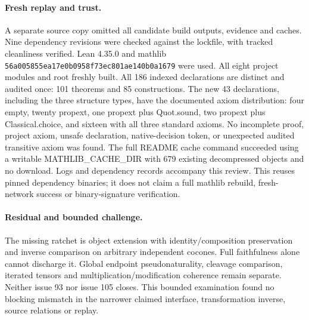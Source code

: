\documentclass{article}
\begin{document}
\paragraph{Fresh replay and trust.} A separate source copy omitted all candidate build outputs, evidence and caches. Nine dependency revisions were checked against the lockfile, with tracked cleanliness verified. Lean 4.35.0 and mathlib \texttt{56a005855ea17e0b0958f73ec801ae140b0a1679} were used. All eight project modules and root freshly built. All 186 indexed declarations are distinct and audited once: 101 theorems and 85 constructions. The new 43 declarations, including the three structure types, have the documented axiom distribution: four empty, twenty propext, one propext plus Quot.sound, two propext plus Classical.choice, and sixteen with all three standard axioms. No incomplete proof, project axiom, unsafe declaration, native-decision token, or unexpected audited transitive axiom was found. The full README cache command succeeded using a writable MATHLIB\_CACHE\_DIR with 679 existing decompressed objects and no download. Logs and dependency records accompany this review. This reuses pinned dependency binaries; it does not claim a full mathlib rebuild, fresh-network success or binary-signature verification.
\paragraph{Residual and bounded challenge.} The missing ratchet is object extension with identity/composition preservation and inverse comparison on arbitrary independent cocones. Full faithfulness alone cannot discharge it. Global endpoint pseudonaturality, cleavage comparison, iterated tensors and multiplication/modification coherence remain separate. Neither issue 93 nor issue 105 closes. This bounded examination found no blocking mismatch in the narrower claimed interface, transformation inverse, source relations or replay.
\end{document}
